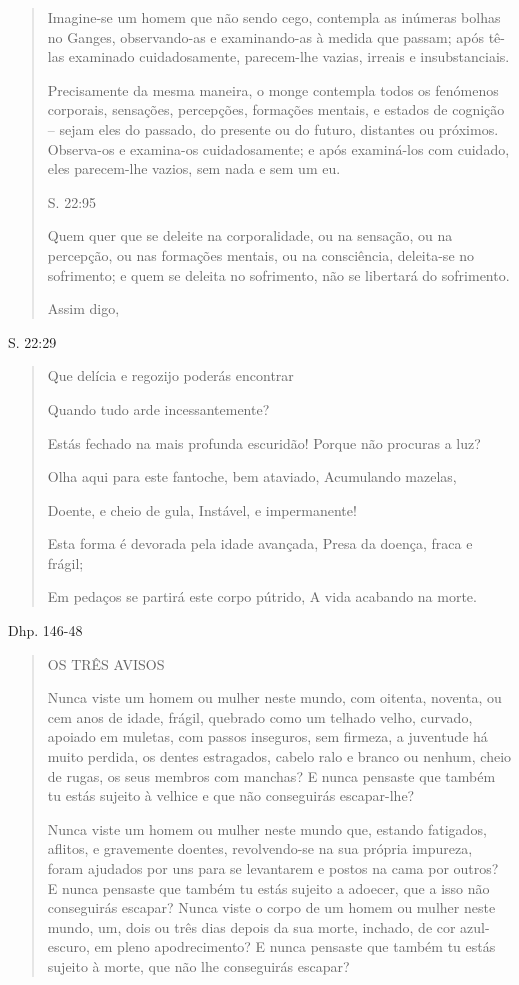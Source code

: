 \begin{quote}
Imagine-se um homem que não sendo cego, contempla as inúmeras bolhas no Ganges, observando-as e examinando-as à medida que passam; após tê-las examinado cuidadosamente, parecem-lhe vazias, irreais e insubstanciais.

Precisamente da mesma maneira, o monge contempla todos os fenómenos corporais, sensações, percepções, formações mentais, e estados de cognição -- sejam eles do passado, do presente ou do futuro, distantes ou próximos. Observa-os e examina-os cuidadosamente; e após examiná-los com cuidado, eles parecem-lhe vazios, sem nada e sem um eu.

S. 22:95

Quem quer que se deleite na corporalidade, ou na sensação, ou na percepção, ou nas formações mentais, ou na consciência, deleita-se no sofrimento; e quem se deleita no sofrimento, não se libertará do sofrimento.

Assim digo,
\end{quote}

S. 22:29

\begin{quote}
Que delícia e regozijo poderás encontrar

Quando tudo arde incessantemente?

Estás fechado na mais profunda escuridão! Porque não procuras a luz?

Olha aqui para este fantoche, bem ataviado, Acumulando mazelas,

Doente, e cheio de gula, Instável, e impermanente!

Esta forma é devorada pela idade avançada, Presa da doença, fraca e frágil;

Em pedaços se partirá este corpo pútrido, A vida acabando na morte.
\end{quote}

Dhp. 146-48

\begin{quote}
OS TRÊS AVISOS

Nunca viste um homem ou mulher neste mundo, com oitenta, noventa, ou cem anos de idade, frágil, quebrado como um telhado velho, curvado, apoiado em muletas, com passos inseguros, sem firmeza, a juventude há muito perdida, os dentes estragados, cabelo ralo e branco ou nenhum, cheio de rugas, os seus membros com manchas? E nunca pensaste que também tu estás sujeito à velhice e que não conseguirás escapar-lhe?

Nunca viste um homem ou mulher neste mundo que, estando fatigados, aflitos, e gravemente doentes, revolvendo-se na sua própria impureza, foram ajudados por uns para se levantarem e postos na cama por outros? E nunca pensaste que também tu estás sujeito a adoecer, que a isso não conseguirás escapar? Nunca viste o corpo de um homem ou mulher neste mundo, um, dois ou três dias depois da sua morte, inchado, de cor azul-escuro, em pleno apodrecimento? E nunca pensaste que também tu estás sujeito à morte, que não lhe conseguirás escapar?
\end{quote}

